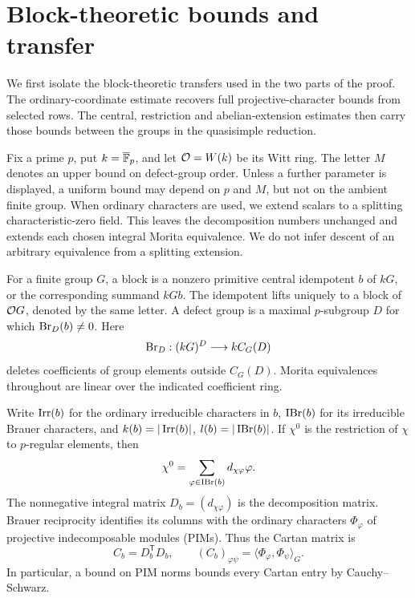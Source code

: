 \section{Block-theoretic bounds and transfer}
\label{sec:preliminaries}

We first isolate the block-theoretic transfers used in the two
parts of the proof.  The ordinary-coordinate estimate recovers full
projective-character bounds from selected rows.  The central,
restriction and abelian-extension estimates then carry those
bounds between the groups in the quasisimple reduction.

Fix a prime \(p\), put \(k=\overline{\mathbb F}_p\), and let
\(\mathcal O=W(k)\) be its Witt ring.  The letter \(M\) denotes an upper bound
on defect-group order.  Unless a further parameter is displayed, a
uniform bound may depend on \(p\) and \(M\), but not on the ambient
finite group.  When ordinary characters are used, we extend scalars to
a splitting characteristic-zero field.  This leaves the decomposition numbers unchanged and extends each
chosen integral Morita equivalence.  We do not infer descent of an
arbitrary equivalence from a splitting extension.

For a finite group \(G\), a block is a nonzero primitive central
idempotent \(b\) of \(kG\), or the corresponding summand \(kGb\).
The idempotent lifts uniquely to a block of \(\mathcal O G\), denoted by the
same letter.  A defect group is a maximal \(p\)-subgroup \(D\) for which
\(\operatorname{Br}_D(b)\ne0\).  Here
\[
 \operatorname{Br}_D:(kG)^D\longrightarrow kC_G(D)
\]
deletes coefficients of group elements outside \(C_G(D)\).
Morita equivalences throughout are linear over the indicated
coefficient ring.

Write \(\operatorname{Irr}(b)\) for the ordinary irreducible characters in \(b\),
\(\operatorname{IBr}(b)\) for its irreducible Brauer characters, and
\(k(b)=|\operatorname{Irr}(b)|\), \(l(b)=|\operatorname{IBr}(b)|\).  If
\(\chi^0\) is the restriction of \(\chi\) to \(p\)-regular elements, then
\[
 \chi^0=\sum_{\varphi\in\operatorname{IBr}(b)}d_{\chi\varphi}\varphi .
\]
The nonnegative integral matrix
\(D_b=(d_{\chi\varphi})\) is the decomposition matrix.
Brauer reciprocity identifies its columns with the ordinary
characters \(\Phi_\varphi\) of projective indecomposable modules
(PIMs).  Thus the Cartan matrix is
\[
 C_b=D_b^{\mathsf T}D_b,\qquad
 (C_b)_{\varphi\psi}=\langle\Phi_\varphi,\Phi_\psi\rangle_G.
\]
In particular, a bound on PIM norms bounds every Cartan entry by
Cauchy--Schwarz.

